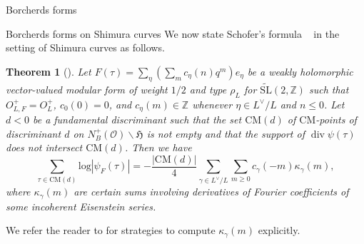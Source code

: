 \documentclass{amsart}
\newtheorem{theorem}{Theorem}
\theoremstyle{definition}
\def\H{\mathfrak H}
\def\O{\mathcal O}
\def\Z{\mathbb Z}
\def\SL{\mathrm{SL}}
\def\div{\operatorname{div}}
\begin{document}
\begin{section}{Borcherds forms}
\begin{subsection}{Borcherds forms on Shimura curves}
We now state Schofer's formula {~\cite[Corollaries 1.2 and
  3.5]{Schofer}} in the setting of Shimura curves as follows.

\begin{theorem}[{\cite[Corollaries 1.2 and 3.5]{Schofer}}]
\label{Schofers formula} Let 
$F(\tau)=\sum_{\eta}\left( \sum_{m}c_{\eta}(n)q^{m}\right){e_{\eta}}$
be a weakly holomorphic vector-valued modular form of weight $1/2$ and
type $\rho_L$ for $\widetilde{\SL}(2,\Z)$ such that $O^+_{L,F}=O^+_L$,
$c_0(0)=0$, and $c_{\eta}(m)\in \Z$ whenever $\eta\in L^\vee/L$ and
$n\leq 0$. Let $d<0$ be a fundamental discriminant such that the set
$\mathrm{CM}(d)$ of $\mathrm{CM}$-points of discriminant $d$ on
$N_B^+(\O)\backslash\H$ is not empty and that the support of
$\div\psi(\tau)$ does not intersect $\mathrm{CM}(d)$. Then we have
$$
  \sum_{\tau \in\mathrm{CM}(d)}\mathrm{log}|\psi_F(\tau)|
=-\frac{|\mathrm{CM}(d)|}{4}\displaystyle\sum_{\gamma\in
  L^{\vee}/L} \sum_{m\geq 0}c_{\gamma}(-m)\kappa_{\gamma}(m),
$$ 
where $\kappa_{\gamma}(m)$ are certain sums involving derivatives of
Fourier coefficients of some incoherent Eisenstein series.
\end{theorem}

We refer the reader to \cite{Errthum,Yang-CM} for strategies to
compute $\kappa_\gamma(m)$ explicitly.
\end{subsection}
\end{section}
\end{document}
